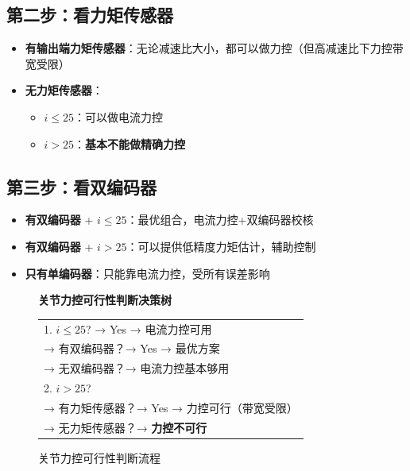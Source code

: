 \subsection{第二步：看力矩传感器}

\begin{itemize}
  \item \textbf{有输出端力矩传感器}：无论减速比大小，都可以做力控（但高减速比下力控带宽受限）
  \item \textbf{无力矩传感器}：
  \begin{itemize}
    \item $i \leq 25$：可以做电流力控
    \item $i > 25$：\textbf{基本不能做精确力控}
  \end{itemize}
\end{itemize}

\subsection{第三步：看双编码器}

\begin{itemize}
  \item \textbf{有双编码器} + $i \leq 25$：最优组合，电流力控+双编码器校核
  \item \textbf{有双编码器} + $i > 25$：可以提供低精度力矩估计，辅助控制
  \item \textbf{只有单编码器}：只能靠电流力控，受所有误差影响
\end{itemize}

\begin{figure}[H]
\centering
\begin{tcolorbox}[colback=lightgray]
\centering
\textbf{关节力控可行性判断决策树}\\
\vspace{5pt}
\begin{tabular}{l}
1. $i \leq 25$? → Yes → 电流力控可用 \\
\hspace{3em} → 有双编码器？→ Yes → 最优方案 \\
\hspace{3em} → 无双编码器？→ 电流力控基本够用 \\
2. $i > 25$? \\
\hspace{3em} → 有力矩传感器？→ Yes → 力控可行（带宽受限）\\
\hspace{3em} → 无力矩传感器？→ \textbf{力控不可行} \\
\end{tabular}
\end{tcolorbox}
\caption{关节力控可行性判断流程}
\label{fig:decision_tree}
\end{figure}

